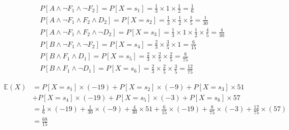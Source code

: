 \documentclass[11pt]{article}
\theoremstyle{definition}
\begin{document}
\begin{enumerate}[leftmargin=0pt, itemsep=3ex]
\begin{enumerate}[leftmargin=0pt, itemsep=3ex]
        \begin{align*}
        &P[A \land \neg F_1 \land \neg F_2] = P[X=s_1]= \frac{1}{3} \times 1 \times \frac{1}{2} = \frac{1}{6}
        \\ &P[A \land \neg F_1 \land F_2 \land D_2] = P[X=s_2] = \frac{1}{3} \times \frac{1}{2} \times \frac{1}{5} = \frac{1}{30}
        \\ &P[A \land \neg F_1 \land F_2 \land \neg D_2] = P[X=s_3] = \frac{1}{3} \times 1 \times \frac{1}{2} \times \frac{4}{5} = \frac{4}{30} 
        \\ &P[B \land \neg F_1 \land \neg F_2] = P[X=s_4] = \frac{2}{3} \times \frac{3}{5} \times 1 = \frac{6}{15}
        \\ &P[B \land F_1 \land D_1] = P[X=s_5] = \frac{2}{3} \times \frac{2}{5} \times \frac{2}{5} = \frac{8}{75}
        \\ &P[B \land F_1 \land \neg D_1] = P[X=s_6] = \frac{2}{3} \times \frac{2}{5} \times \frac{3}{5} = \frac{12}{75}
        \end{align*}
    
        \begin{align*}
            \mathbb{E}(X) 
            & =  P[X=s_1] \times (-19) + P[X=s_2] \times (-9) + 
           P[X=s_3] \times 51 
           \\ &+ P[X=s_4] \times (-19) + P[X=s_5] \times (-3) + P[X=s_6] \times 57
           \\ & = \frac{1}{6} \times (-19) + \frac{1}{30} \times (-9) + \frac{4}{30} \times 51 + \frac{6}{15} \times (-19) + \frac{8}{75} \times (-3) + \frac{12}{75} \times (57)
           \\ & = \frac{68}{15}
       \end{align*}
    
        
    \end{enumerate}
    
    
\end{enumerate}
\end{document}
